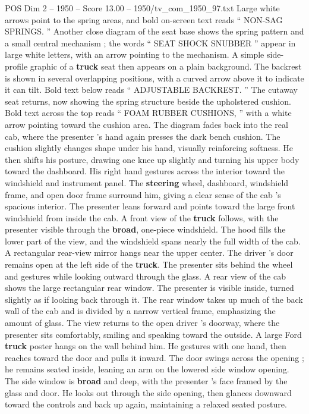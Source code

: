 \begin{textsample}{POS Dim 2 – 1950 – Score 13.00 – 1950/tv\_com\_1950\_97.txt}
Large white arrows point to the spring areas, and bold on-screen text reads “ NON-SAG SPRINGS. ” Another close diagram of the seat base shows the spring pattern and a small central mechanism ; the words “ SEAT SHOCK SNUBBER ” appear in large white letters, with an arrow pointing to the mechanism.
A simple side-profile graphic of a \textbf{truck} seat then appears on a plain background.
The backrest is shown in several overlapping positions, with a curved arrow above it to indicate it can tilt.
Bold text below reads “ ADJUSTABLE BACKREST. ” The cutaway seat returns, now showing the spring structure beside the upholstered cushion.
Bold text across the top reads “ FOAM RUBBER CUSHIONS, ” with a white arrow pointing toward the cushion area.
The diagram fades back into the real cab, where the presenter ’s hand again presses the dark bench cushion.
The cushion slightly changes shape under his hand, visually reinforcing softness.
He then shifts his posture, drawing one knee up slightly and turning his upper body toward the dashboard.
His right hand gestures across the interior toward the windshield and instrument panel.
The \textbf{steering} wheel, dashboard, windshield frame, and open door frame surround him, giving a clear sense of the cab ’s spacious interior.
The presenter leans forward and points toward the large front windshield from inside the cab.
A front view of the \textbf{truck} follows, with the presenter visible through the \textbf{broad}, one-piece windshield.
The hood fills the lower part of the view, and the windshield spans nearly the full width of the cab.
A rectangular rear-view mirror hangs near the upper center.
The driver ’s door remains open at the left side of the \textbf{truck}.
The presenter sits behind the wheel and gestures while looking outward through the glass.
A rear view of the cab shows the large rectangular rear window.
The presenter is visible inside, turned slightly as if looking back through it.
The rear window takes up much of the back wall of the cab and is divided by a narrow vertical frame, emphasizing the amount of glass.
The view returns to the open driver ’s doorway, where the presenter sits comfortably, smiling and speaking toward the outside.
A large Ford \textbf{truck} poster hangs on the wall behind him.
He gestures with one hand, then reaches toward the door and pulls it inward.
The door swings across the opening ; he remains seated inside, leaning an arm on the lowered side window opening.
The side window is \textbf{broad} and deep, with the presenter ’s face framed by the glass and door.
He looks out through the side opening, then glances downward toward the controls and back up again, maintaining a relaxed seated posture.

\end{textsample}
